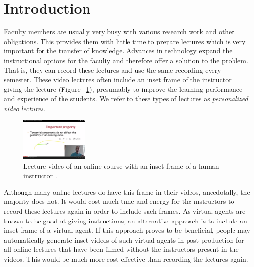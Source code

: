 \documentclass{sigchi}
\begin{document}



\section{Introduction}

Faculty members are usually very busy with various research work and other obligations. This provides them with little time to prepare lectures which is very important for the transfer of knowledge. Advances in technology expand the instructional options for the faculty and therefore offer a solution to the problem. That is, they can record these lectures and use the same recording every semester. These video lectures often include an inset frame of the instructor giving the lecture (Figure ~\ref{fig:mooc_inset}), presumably to improve the learning performance and experience of the students. We refer to these types of lectures as {\it personalized video lectures}. 

\begin{figure}
    \centering
    \includegraphics[width=0.3\textwidth]{Figures/mooc_inset.png}
    \caption{Lecture video of an online course with an inset frame of a human instructor \protect\cite{improc}.}
    \label{fig:mooc_inset}
\end{figure}

Although many online lectures do have this frame in their videos, anecdotally, the majority does not. It would cost much time and energy for the instructors to record these lectures again in order to include such frames. As virtual agents are known to be good at giving instructions, an alternative approach is to include an inset frame of a virtual agent. If this approach proves to be beneficial, people may automatically generate inset videos of such virtual agents in post-production for all online lectures that have been filmed without the instructors present in the videos. This would be much more cost-effective than recording the lectures again.
\end{document}
